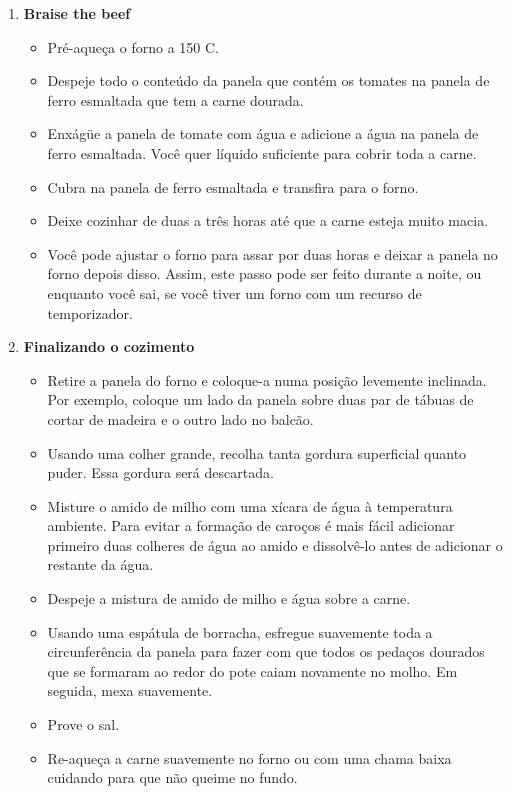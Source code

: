 \documentclass [11pt, letterpaper] {article}
\begin{document}
\begin {description}
\begin {enumerate}
\item {\bf Braise the beef}
\begin {itemize}
\item Pré-aqueça o forno a 150 C.
\item Despeje todo o conteúdo da panela que contém os tomates na panela de ferro esmaltada que tem a carne dourada.
\item Enxágüe a panela de tomate com água e adicione a água na panela de ferro esmaltada. Você quer líquido suficiente para cobrir toda a carne.
\item Cubra na panela de ferro esmaltada e transfira para o forno.
\item Deixe cozinhar de duas a três horas até que a carne esteja muito macia.
\item Você pode ajustar o forno para assar por duas horas e deixar a panela no forno depois disso. Assim, este passo pode ser feito durante a noite, ou enquanto você sai, se você tiver um forno com um recurso de temporizador.
\end {itemize}
\item {\bf Finalizando o cozimento}
\begin {itemize}
\item Retire a panela do forno e coloque-a numa posição levemente inclinada. Por exemplo, coloque um lado da panela sobre duas par de tábuas de cortar de madeira e o outro lado no balcão.
\item Usando uma colher grande, recolha tanta gordura superficial quanto puder. Essa gordura será descartada.
\item Misture o amido de milho com uma x\'icara de água à temperatura ambiente. Para evitar a forma\c{c}\~ao de caroços é mais fácil adicionar primeiro duas colheres de água ao amido e dissolvê-lo antes de adicionar o restante da água.
\item Despeje a mistura de amido de milho e água sobre a carne.
\item Usando uma espátula de borracha, esfregue suavemente toda a circunferência da panela para fazer com que todos os pedaços dourados que se formaram ao redor do pote caiam novamente no molho. Em seguida, mexa suavemente.
\item Prove o sal.
\item Re-aqueça a carne suavemente no forno ou com uma chama baixa cuidando para que não queime no fundo.
\end {itemize}
     \end {enumerate}
\end {description}
\end{document}
